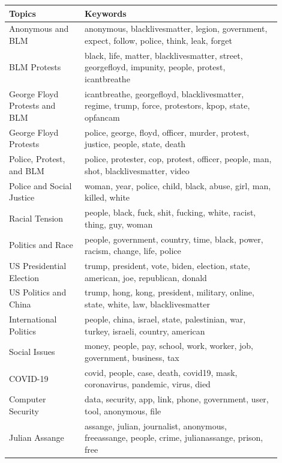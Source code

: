 \documentclass[letterpaper]{article}
\begin{document}
\begin{table}[!ht]
\footnotesize
\centering
\begin{tabular}{p{0.25\linewidth} >{\raggedright\arraybackslash}p{0.65\linewidth}} 
 \toprule
 \textbf{Topics} & \textbf{Keywords} \\ [0.5ex] 
 \midrule
 Anonymous and BLM & anonymous, blacklivesmatter, legion, government, expect, follow, police, think, leak, forget \\
 \midrule
BLM Protests & black, life, matter, blacklivesmatter, street, georgefloyd, impunity, people, protest, icantbreathe \\
 \midrule
George Floyd Protests and BLM & icantbreathe, georgefloyd, blacklivesmatter, regime, trump, force, protestors, kpop, state, opfancam \\
  \midrule
George Floyd Protests & police, george, floyd, officer, murder, protest, justice, people, state, death \\
  \midrule
Police, Protest, and BLM & police, protester, cop, protest, officer, people, man, shot, blacklivesmatter, video \\
 \midrule
Police and Social Justice & woman, year, police, child, black, abuse, girl, man, killed, white \\
  \midrule
 Racial Tension & people, black, fuck, shit, fucking, white, racist, thing, guy, woman \\
   \midrule
Politics and Race & people, government, country, time, black, power, racism, change, life, police \\
  \midrule
US Presidential Election & trump, president, vote, biden, election, state, american, joe, republican, donald \\
 \midrule
 US Politics and China & trump, hong, kong, president, military, online, state, white, law, blacklivesmatter \\
  \midrule
International Politics & people, china, israel, state, palestinian, war, turkey, israeli, country, american \\
  \midrule
Social Issues & money, people, pay, school, work, worker, job, government, business, tax \\
  \midrule
COVID-19 & covid, people, case, death, covid19, mask, coronavirus, pandemic, virus, died \\
  \midrule
Computer Security & data, security, app, link, phone, government, user, tool, anonymous, file \\
 \midrule
 Julian Assange & assange, julian, journalist, anonymous, freeassange, people, crime, julianassange, prison, free \\

\end{tabular}
\end{table}
\end{document}
